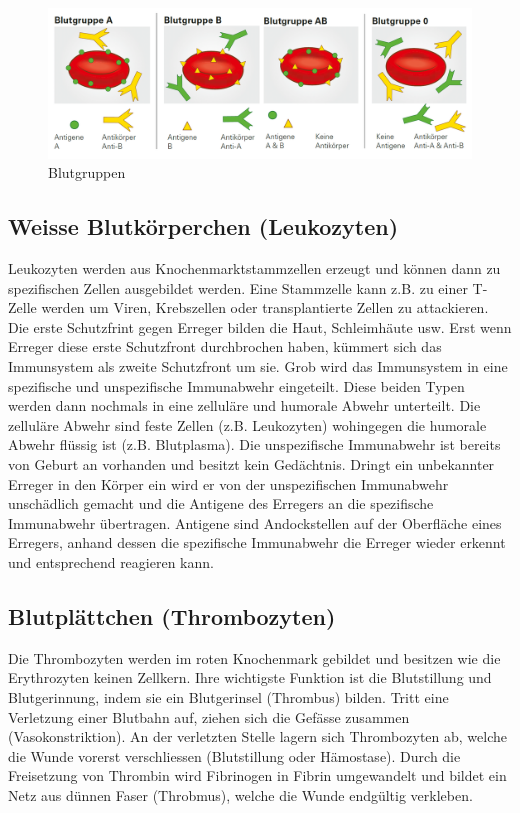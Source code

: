 \begin{figure}
\centering
\includegraphics[width=0.7\linewidth]{fig/blutgruppen}
\caption{Blutgruppen}
\label{fig:blutgruppen}
\end{figure}

\subsection{Weisse Blutkörperchen (Leukozyten)}

Leukozyten werden aus Knochenmarktstammzellen erzeugt und können dann zu spezifischen Zellen ausgebildet werden. Eine Stammzelle kann z.B. zu einer T-Zelle werden um Viren, Krebszellen oder transplantierte Zellen zu attackieren. Die erste Schutzfrint gegen Erreger bilden die Haut, Schleimhäute usw. Erst wenn Erreger diese erste Schutzfront durchbrochen haben, kümmert sich das Immunsystem als zweite Schutzfront um sie. Grob wird das Immunsystem in eine spezifische und unspezifische Immunabwehr eingeteilt. Diese beiden Typen werden dann nochmals in eine zelluläre und humorale Abwehr unterteilt. Die zelluläre Abwehr sind feste Zellen (z.B. Leukozyten) wohingegen die humorale Abwehr flüssig ist (z.B. Blutplasma). Die unspezifische Immunabwehr ist bereits von Geburt an vorhanden und besitzt kein Gedächtnis. Dringt ein unbekannter Erreger in den Körper ein wird er von der unspezifischen Immunabwehr unschädlich gemacht und die Antigene des Erregers an die spezifische Immunabwehr übertragen. Antigene sind Andockstellen auf der Oberfläche eines Erregers, anhand dessen die spezifische Immunabwehr die Erreger wieder erkennt und entsprechend reagieren kann.

\subsection{Blutplättchen (Thrombozyten)}

Die Thrombozyten werden im roten Knochenmark gebildet und besitzen wie die Erythrozyten keinen Zellkern. Ihre wichtigste Funktion ist die Blutstillung und Blutgerinnung, indem sie ein Blutgerinsel (Thrombus) bilden. Tritt eine Verletzung einer Blutbahn auf, ziehen sich die Gefässe zusammen (Vasokonstriktion). An der verletzten Stelle lagern sich Thrombozyten ab, welche die Wunde vorerst verschliessen (Blutstillung oder Hämostase). Durch die Freisetzung von Thrombin wird Fibrinogen in Fibrin umgewandelt und bildet ein Netz aus dünnen Faser (Throbmus), welche die Wunde endgültig verkleben. 

